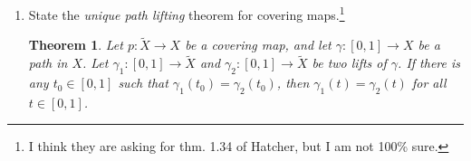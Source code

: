 \documentclass{article}
\newtheorem*{theorem}{Theorem}
\DeclareMathOperator{\im}{im}
\begin{document}
\begin{enumerate}
\begin{proof}
Noether's first isomorphism theorem tells us that $ \pi_1(C) = \im \Phi \cong \pi_1(X)/\ker \Phi.$
Since $A \times [0,1] / \sim$ is contractable (e.g. onto the point $(a,0)$) we know that $\pi_1(A\times \{1\})$ 
is contained in the kernel of $\pi_1(X)$.
On the other hand, the surjection $\Phi$ is constructed by a quotient of the free product $\pi_1(X\times \{1\}) * 0$
by the normal subgroup generated by loops in $\pi_1(A\times\{1\})$, and so the kernel contains \emph{only} 
points in $\pi_1(A \times \{1\})$. Thus, $\pi_1(C) \cong \pi_1(X \times \{1\})/\pi_1(A \times \{1 \}) \cong \pi_1(X)/\pi_1(A)$.

Strictly speaking, we have computed $\pi_1(C,(p,1))$. However, since everything we have dealt with is path connected,
we obtain the isomorphism $\pi_1(C, (p,1)) \cong \pi_1(C, (p, 1/2))$. 

\end{proof}
	
\setcounter{enumi}{9}
\item State the \emph{unique path lifting} theorem for covering maps.\footnote{I think they are asking for thm. 1.34 of Hatcher, but I am not 100\% sure.}

\begin{theorem}
Let $p: \tilde{X} \rightarrow X$ be a covering map, and let $\gamma: [0,1] \rightarrow X$ be a
path in $X$. Let $\gamma_1: [0,1] \rightarrow \tilde{X}$ and $\gamma_2: [0,1]\rightarrow \tilde{X}$
be two lifts of $\gamma$. If there is any $t_0 \in [0,1]$ such that $\gamma_1(t_0) = \gamma_2(t_0)$, then
$\gamma_1(t) = \gamma_2(t)$ for all $t \in [0,1]$.
\end{theorem}

\end{enumerate}
\end{document}
